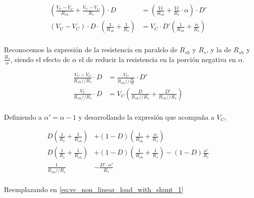 \begin{equation}
    \label{eq:vc_non_linear_load_with_shunt_0}
    \begin{aligned}
        \left( \frac{V_U-V_C}{R_{sh}} + \frac{V_U-V_C}{R_{s}} \right) \cdot D &=
        \left( \frac{Vc}{R_{sh}} + \frac{Vc}{R_{s}} \cdot \alpha \right) \cdot D' \\
        \left( V_U - V_C \right) \cdot D \cdot \left( \frac{1}{R_{sh}} +
        \frac{1}{R_s} \right) &= V_C \cdot D' \left( \frac{1}{R_{sh}} +
        \frac{\alpha}{R_s} \right) \\
    \end{aligned}
\end{equation}

Reconocemos la expresión de la resistencia en paralelo de $R_{sh}$ y $R_s$, y la
de $R_{sh}$ y $\frac{R_s}{\alpha}$, siendo el efecto de $\alpha$ el de reducir
la resistencia en la porción negativa en $\alpha$.

\begin{equation}
    \label{eq:vc_non_linear_load_with_shunt_1}
    \begin{aligned}
        \frac{V_U-V_C}{R_{sh} // R_{s}} \cdot D &= \frac{V_C}{R_{sh} //
        \frac{R_{s}}{\alpha}} \cdot D'  \\
        \frac{V_U}{R_{sh} // R_{s}} \cdot D &= V_C \left( \frac{D}{R_{sh}
        // R_{s}} + \frac{D'}{R_{sh} // R_{s}} \right) \\
    \end{aligned}
\end{equation}

Definiendo a $\alpha'=\alpha-1$ y desarrollando la expresión que acompaña a $V_C$,

\begin{equation}
    \begin{aligned}
        D \left( \frac{1}{R_s} + \frac{1}{R_{sh}} \right) &+ (1-D) \left(
        \frac{1}{R_{sh}} + \frac{\alpha}{R_s} \right) \\
        D \left( \frac{1}{R_s} + \frac{1}{R_{sh}} \right) &+ (1-D) \left(
        \frac{1}{R_{sh}} + \frac{1}{R_s} \right) - (1-D) \frac{\alpha'}{R_s} \\
        \frac{1}{R_{sh} // R_{s}} &- \frac{D' \cdot \alpha'}{R_s} \\
    \end{aligned}
\end{equation}

Reemplazando en \ref{eq:vc_non_linear_load_with_shunt_1}

